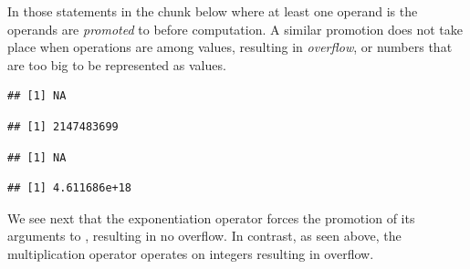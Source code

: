 \documentclass[krantz2]{krantz}\usepackage{knitr}%
\begin{document}
\begin{explainbox}
In those statements in the chunk below where at least one operand is  the  operands are \emph{promoted} to  before computation. A similar promotion does not take place when operations are among  values, resulting in \emph{overflow}, or numbers that are too big to be represented as  values.

\begin{knitrout}\footnotesize
{}\color{fgcolor}\begin{kframe}
\begin{alltt}
 \hlopt{+} 
\end{alltt}


{\ttfamily\noindent\color{warningcolor}{\#\# Warning in 2147483600L + 99L: NAs produced by integer overflow}}\begin{verbatim}
## [1] NA
\end{verbatim}
\begin{alltt}
 \hlopt{+} 
\end{alltt}
\begin{verbatim}
## [1] 2147483699
\end{verbatim}
\begin{alltt}
 \hlopt{*} 
\end{alltt}


{\ttfamily\noindent\color{warningcolor}{\#\# Warning in 2147483600L * 2147483600L: NAs produced by integer overflow}}\begin{verbatim}
## [1] NA
\end{verbatim}
\begin{alltt}
 \hlopt{*} 
\end{alltt}
\begin{verbatim}
## [1] 4.611686e+18
\end{verbatim}
\end{kframe}
\end{knitrout}

We see next that the exponentiation operator \Roperator{\^{}} forces the promotion of its arguments to , resulting in no overflow. In contrast, as seen above, the multiplication operator \Roperator{*} operates on integers resulting in overflow.

\begin{knitrout}\footnotesize
{}\color{fgcolor}\begin{kframe}
\begin{alltt}
 \hlopt{*} 
\end{alltt}



\end{kframe}
\end{knitrout}
\end{explainbox}
\end{document}
